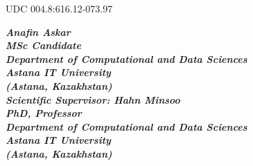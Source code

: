 \documentclass[14pt]{extarticle}
\begin{document}
{\onehalfspacing
\noindent UDC 004.8:616.12-073.97 \par
\vspace{1em}

\begin{flushright}
\itshape\bfseries
Anafin Askar \\
MSc Candidate \\
Department of Computational and Data Sciences \\
Astana IT University \\
(Astana, Kazakhstan) \\
\vspace{1em}
Scientific Supervisor: Hahn Minsoo \\
PhD, Professor \\
Department of Computational and Data Sciences \\
Astana IT University \\
(Astana, Kazakhstan)
\end{flushright}
\vspace{1.5em}

}
\end{document}

